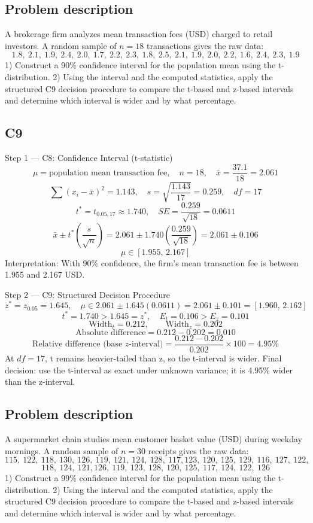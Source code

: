 \begin{ExamProblems}
		\subsection*{Problem description}
		A brokerage firm analyzes mean transaction fees (USD) charged to retail investors.
		A random sample of $n=18$ transactions gives the raw data:
		\[
		1.8,\ 2.1,\ 1.9,\ 2.4,\ 2.0,\ 1.7,\ 2.2,\ 2.3,\ 1.8,\ 2.5,\ 2.1,\ 1.9,\ 2.0,\ 2.2,\ 1.6,\ 2.4,\ 2.3,\ 1.9
		\]
		1) Construct a 90\% confidence interval for the population mean using the t-distribution.
		2) Using the interval and the computed statistics, apply the structured C9 decision procedure to compare the t-based and z-based intervals and determine which interval is wider and by what percentage.

		\subsection*{C9}
		Step 1 --- C8: Confidence Interval (t-statistic)
		\[
		\mu=\text{population mean transaction fee},\quad n=18,\quad \bar{x}=\frac{37.1}{18}=2.061
		\]
		\[
		\sum (x_i-\bar{x})^2=1.143,\quad s=\sqrt{\frac{1.143}{17}}=0.259,\quad df=17
		\]
		\[
		t^*=t_{0.05,17}\approx 1.740,\quad SE=\frac{0.259}{\sqrt{18}}=0.0611
		\]
		\[
		\bar{x}\pm t^*\left(\frac{s}{\sqrt{n}}\right)=2.061\pm 1.740\left(\frac{0.259}{\sqrt{18}}\right)=2.061\pm 0.106
		\]
		\[
		\mu\in[1.955,\,2.167]
		\]
		Interpretation: With 90\% confidence, the firm's mean transaction fee is between 1.955 and 2.167 USD.

		Step 2 --- C9: Structured Decision Procedure
		\[
		z^*=z_{0.05}=1.645,\quad \mu\in 2.061\pm 1.645(0.0611)=2.061\pm 0.101=[1.960,\,2.162]
		\]
		\[
		t^*=1.740>1.645=z^*,\quad E_t=0.106>E_z=0.101
		\]
		\[
		\text{Width}_t=0.212,\qquad \text{Width}_z=0.202
		\]
		\[
		\text{Absolute difference}=0.212-0.202=0.010
		\]
		\[
		\text{Relative difference (base }z\text{-interval)}=\frac{0.212-0.202}{0.202}\times 100=4.95\%
		\]
		At $df=17$, t remains heavier-tailed than z, so the t-interval is wider.
		Final decision: use the t-interval as exact under unknown variance; it is 4.95\% wider than the z-interval.

		\newpage
		\item
		\subsection*{Problem description}
		A supermarket chain studies mean customer basket value (USD) during weekday mornings.
		A random sample of $n=30$ receipts gives the raw data:
		\[
		115,\ 122,\ 118,\ 130,\ 126,\ 119,\ 121,\ 124,\ 128,\ 117,
		123,\ 120,\ 125,\ 129,\ 116,\ 127,\ 122,\]
		\[	 118,\ 124,\ 121,
		126,\ 119,\ 123,\ 128,\ 120,\ 125,\ 117,\ 124,\ 122,\ 126
		\]
		1) Construct a 99\% confidence interval for the population mean using the t-distribution.
		2) Using the interval and the computed statistics, apply the structured C9 decision procedure to compare the t-based and z-based intervals and determine which interval is wider and by what percentage.


\end{ExamProblems}

